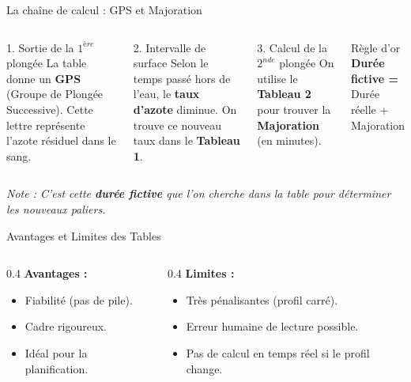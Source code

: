 \begin{frame}{La chaîne de calcul : GPS et Majoration}
    \begin{columns}[T]
        \begin{block}{1. Sortie de la $1^{ère}$ plongée}
            La table donne un \textbf{GPS} (Groupe de Plongée Successive). Cette lettre représente l'azote résiduel dans le sang.
        \end{block}
        
        \begin{block}{2. Intervalle de surface}
            Selon le temps passé hors de l'eau, le \textbf{taux d'azote} diminue. On trouve ce nouveau taux dans le \textbf{Tableau 1}.
        \end{block}

        \begin{block}{3. Calcul de la $2^{nde}$ plongée}
            On utilise le \textbf{Tableau 2} pour trouver la \textbf{Majoration} (en minutes).
        \end{block}
        
        \begin{alertblock}{Règle d'or}
            \centering
            \textbf{Durée fictive =} \\
            Durée réelle + Majoration
        \end{alertblock}
    \end{columns}
    \vspace{0.3cm}
    \textit{Note : C'est cette \textbf{durée fictive} que l'on cherche dans la table pour déterminer les nouveaux paliers.}
\end{frame}

\begin{frame}{Avantages et Limites des Tables}
    \begin{columns}
        \begin{column}{0.4\textwidth}
            \textbf{Avantages :}
            \begin{itemize}
                \item Fiabilité (pas de pile).
                \item Cadre rigoureux.
                \item Idéal pour la planification.
            \end{itemize}
        \end{column}
        \begin{column}{0.4\textwidth}
            \textbf{Limites :}
            \begin{itemize}
                \item Très pénalisantes (profil carré).
                \item Erreur humaine de lecture possible.
                \item Pas de calcul en temps réel si le profil change.
            \end{itemize}
        \end{column}
    \end{columns}
\end{frame}